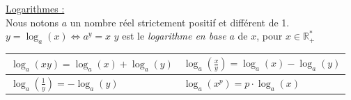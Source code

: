 \documentclass[12pt, letterpaper]{article}
\begin{document}
\underline{Logarithmes :}
\\
Nous notons $a$ un nombre réel strictement positif et différent de 1.
\\
$y = \log_{a}(x) \Leftrightarrow a^y = x$ \hspace*{2em} $y$ est le \textit{logarithme en base} $a$ de $x$, pour $x \in \mathbb{R}_+^*$ 
    \begin{center}
        \begin{tabular}{|l|l|}
        \hline
        \rule{0pt}{1.8em}
        $\log_a(xy) = \log_a(x) + \log_a(y)$ & $\log_a\left(\frac{x}{y}\right) = \log_a(x)-\log_a(y)$ \\[8pt]
        \hline
        \rule{0pt}{1.4em}
        $\log_a\left(\frac{1}{y}\right) = -\log_a(y)$ & $\log_a(x^p) = p \cdot \log_a(x)$ \\[8pt]
        \hline
        \end{tabular}
    \end{center}
\end{document}

